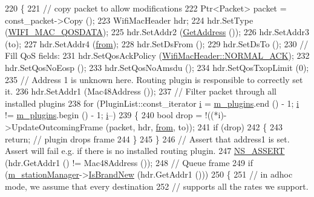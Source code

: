 \begin{DoxyCode}
220 \{
221   \textcolor{comment}{// copy packet to allow modifications}
222   Ptr<Packet> packet = const\_packet->Copy ();
223   WifiMacHeader hdr;
224   hdr.SetType (\hyperlink{namespacens3_a9318472db39b35b2092de5c721e6ab0aafd37aea1ac3edba5410fac6367b19b1d}{WIFI\_MAC\_QOSDATA});
225   hdr.SetAddr2 (\hyperlink{classns3_1_1RegularWifiMac_aea719a7d05fbc664c50479fc900777b7}{GetAddress} ());
226   hdr.SetAddr3 (to);
227   hdr.SetAddr4 (\hyperlink{lte__amc_8m_a1b4c81ff74eb1a626b5ade44c81004b3}{from});
228   hdr.SetDsFrom ();
229   hdr.SetDsTo ();
230   \textcolor{comment}{// Fill QoS fields:}
231   hdr.SetQosAckPolicy (\hyperlink{classns3_1_1WifiMacHeader_ae3a382482f357972019f5e1b3162adc4a9f52b9c6ca65d046ce2be9d70bce28cf}{WifiMacHeader::NORMAL\_ACK});
232   hdr.SetQosNoEosp ();
233   hdr.SetQosNoAmsdu ();
234   hdr.SetQosTxopLimit (0);
235   \textcolor{comment}{// Address 1 is unknown here. Routing plugin is responsible to correctly set it.}
236   hdr.SetAddr1 (Mac48Address ());
237   \textcolor{comment}{// Filter packet through all installed plugins}
238   \textcolor{keywordflow}{for} (PluginList::const\_iterator \hyperlink{bernuolliDistribution_8m_a6f6ccfcf58b31cb6412107d9d5281426}{i} = \hyperlink{classns3_1_1MeshWifiInterfaceMac_ace0a54623c4daa3e9fc7f5570a84683c}{m\_plugins}.end () - 1; \hyperlink{bernuolliDistribution_8m_a6f6ccfcf58b31cb6412107d9d5281426}{i} != 
      \hyperlink{classns3_1_1MeshWifiInterfaceMac_ace0a54623c4daa3e9fc7f5570a84683c}{m\_plugins}.begin () - 1; \hyperlink{bernuolliDistribution_8m_a6f6ccfcf58b31cb6412107d9d5281426}{i}--)
239     \{
240       \textcolor{keywordtype}{bool} drop = !((*i)->UpdateOutcomingFrame (packet, hdr, \hyperlink{lte__amc_8m_a1b4c81ff74eb1a626b5ade44c81004b3}{from}, to));
241       \textcolor{keywordflow}{if} (drop)
242         \{
243           \textcolor{keywordflow}{return}; \textcolor{comment}{// plugin drops frame}
244         \}
245     \}
246   \textcolor{comment}{// Assert that address1 is set. Assert will fail e.g. if there is no installed routing plugin.}
247   \hyperlink{assert_8h_a6dccdb0de9b252f60088ce281c49d052}{NS\_ASSERT} (hdr.GetAddr1 () != Mac48Address ());
248   \textcolor{comment}{// Queue frame}
249   \textcolor{keywordflow}{if} (\hyperlink{classns3_1_1RegularWifiMac_a76d1a5e27b64bfe36f24a55d1eea2775}{m\_stationManager}->\hyperlink{classns3_1_1WifiRemoteStationManager_a7545940536c6520140bc7ff44b952d5d}{IsBrandNew} (hdr.GetAddr1 ()))
250     \{
251       \textcolor{comment}{// in adhoc mode, we assume that every destination}
252       \textcolor{comment}{// supports all the rates we support.}

\end{DoxyCode}

